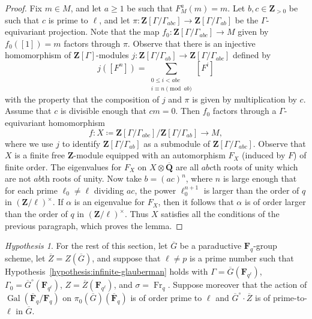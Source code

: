 \documentclass[reqno]{amsart}
\numberwithin{equation}{subsection}
\newcommand{\F}{\mathbf{F}}
\newcommand{\Q}{\mathbf{Q}}
\newcommand{\Z}{\mathbf{Z}}
\newcommand{\Gal}{\operatorname{Gal}}
\newcommand{\ol}[1]{\overline{#1}}
\newcommand{\co}{\colon}
\DeclareMathOperator{\Fr}{Fr}
\theoremstyle{remark}
\newtheorem{hypothesis}[thm]{Hypothesis}
\numberwithin{equation}{subsection}
\numberwithin{figure}{subsection}
\begin{document}
\begin{proof}
    Fix $m \in M$, and let $a\geq 1$ be such that $F_M^a(m) = m$. Let $b, c \in \Z_{>0}$ be such that $c$ is prime to $\ell$, and let $\pi\co \Z[\Gamma/\Gamma_{abc}] \to \Z[\Gamma/\Gamma_{ab}]$ be the $\Gamma$-equivariant projection. Note that the map $f_0\co \Z[\Gamma/\Gamma_{abc}] \to M$ given by $f_0([1]) = m$ factors through $\pi$. Observe that there is an injective homomorphism of $\Z[\Gamma]$-modules $j\co \Z[\Gamma/\Gamma_{ab}] \to \Z[\Gamma/\Gamma_{abc}]$ defined by
    \[
    j([F^n]) = \sum_{\substack{0\leq i<abc \\ i \equiv n\pmod{ab}}} [F^i]
    \]
    with the property that the composition of $j$ and $\pi$ is given by multiplication by $c$.
    Assume that $c$ is divisible enough that $cm = 0$. Then $f_0$ factors through a $\Gamma$-equivariant homomorphism
    \[
    f\co X\coloneqq \Z[\Gamma/\Gamma_{abc}]/\Z[\Gamma/\Gamma_{ab}] \to M,
    \]
    where we use $j$ to identify $\Z[\Gamma/\Gamma_{ab}]$ as a submodule of $\Z[\Gamma/\Gamma_{abc}]$. Observe that $X$ is a finite free $\Z$-module equipped with an automorphism $F_X$ (induced by $F$) of finite order. The eigenvalues for $F_X$ on $X \otimes \ol\Q$ are all $abc$th roots of unity which are not $ab$th roots of unity. Now take $b = (ac)^n$, where $n$ is large enough that for each prime $\ell_0 \neq \ell$ dividing $ac$, the power $\ell_0^{n+1}$ is larger than the order of $q$ in $(\Z/\ell)^\times$. If $\alpha$ is an eigenvalue for $F_X$, then it follows that $\alpha$ is of order larger than the order of $q$ in $(\Z/\ell)^\times$.
    Thus $X$ satisfies all the conditions of the previous paragraph, which proves the lemma.
\end{proof}

\begin{hypothesis}\label{hypothesis:glauberman-finite-reductive}
    For the rest of this section, let $\ol G$ be a paraductive $\F_q$-group scheme, let $\ol Z = Z(\ol G)$, and suppose that $\ell \neq p$ is a prime number such that Hypothesis~\ref{hypothesis:infinite-glauberman} holds with $\Gamma = \ol G(\F_{q^\ell})$, $\Gamma_0 = \ol G^\circ(\F_{q^\ell})$, $Z = \ol Z(\F_{q^\ell})$, and $\sigma = \Fr_q$. Suppose moreover that the action of $\Gal(\ol\F_q/\F_q)$ on $\pi_0(\ol G)(\ol\F_q)$ is of order prime to $\ell$ and $\ol G^\circ \cdot \ol Z$ is of prime-to-$\ell$ in $\ol G$.
\end{hypothesis}
\end{document}
